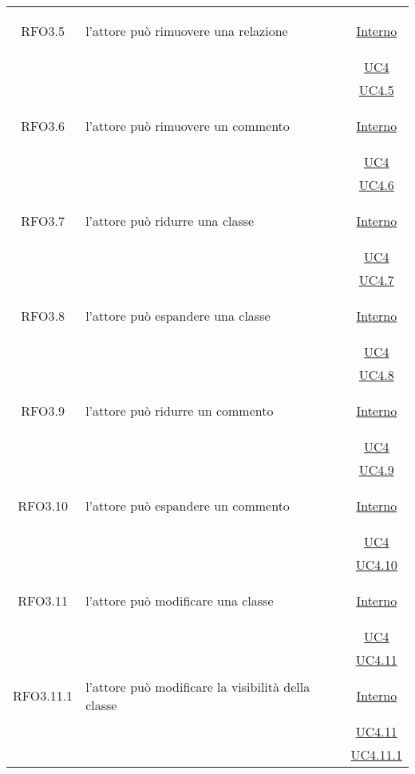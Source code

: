 \begin{longtable}{|c|>{\centering}m{7cm}|c|}
\hypertarget{RFO3.5}{RFO3.5} & l'attore può rimuovere una relazione &  \hyperlink{Interno}{Interno}\\
& &\hyperref[UC4]{UC4}\\
& &\hyperref[UC4.5]{UC4.5}\\ \hline

\hypertarget{RFO3.6}{RFO3.6} & l'attore può rimuovere un commento &  \hyperlink{Interno}{Interno}\\
& &\hyperref[UC4]{UC4}\\
& &\hyperref[UC4.6]{UC4.6}\\ \hline

\hypertarget{RFO3.7}{RFO3.7} & l'attore può ridurre una classe &  \hyperlink{Interno}{Interno}\\
& &\hyperref[UC4]{UC4}\\
& &\hyperref[UC4.7]{UC4.7}\\ \hline

\hypertarget{RFO3.8}{RFO3.8} & l'attore può espandere una classe &  \hyperlink{Interno}{Interno}\\
& &\hyperref[UC4]{UC4}\\
& &\hyperref[UC4.8]{UC4.8}\\ \hline

\hypertarget{RFO3.9}{RFO3.9} & l'attore può ridurre un commento &  \hyperlink{Interno}{Interno}\\
& &\hyperref[UC4]{UC4}\\
& &\hyperref[UC4.9]{UC4.9}\\ \hline

\hypertarget{RFO3.10}{RFO3.10} & l'attore può espandere un commento &  \hyperlink{Interno}{Interno}\\
& &\hyperref[UC4]{UC4}\\
& &\hyperref[UC4.10]{UC4.10}\\ \hline

\hypertarget{RFO3.11}{RFO3.11} & l'attore può modificare una classe &  \hyperlink{Interno}{Interno}\\
& &\hyperref[UC4]{UC4}\\
& &\hyperref[UC4.11]{UC4.11}\\ \hline

\hypertarget{RFO3.11.1}{RFO3.11.1} & l'attore può modificare la visibilità della classe &  \hyperlink{Interno}{Interno}\\
& &\hyperref[UC4.11]{UC4.11}\\
& &\hyperref[UC4.11.1]{UC4.11.1}\\ \hline


\end{longtable}
